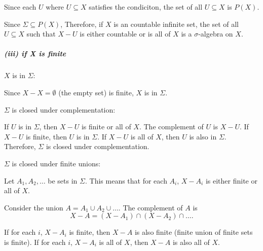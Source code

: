 \documentclass[12pt]{article}
\begin{document}
\par \hspace*{1em}Since each \( U \) where \( U \subseteq X \) satisfies the condiciton, the set of all \( U \subseteq X \) is \( P(X) \). \\
\par \hspace*{1em}Since \( \Sigma \subseteq P(X) \), Therefore, if \( X \) is an countable infinite set, the set of all \( U \subseteq X \) such that \( X - U \) is either countable or is all of \(X\) is a \( \sigma \)-algebra on \( X \).
\subparagraph{(iii) if X is finite}

\par \hspace*{1em}$X$ is in $\Sigma$:

\par \hspace*{1em}Since $X - X = \emptyset$ (the empty set) is finite, $X$ is in $\Sigma$.

\par \hspace*{1em}$\Sigma$ is closed under complementation:

\par \hspace*{1em}If $U$ is in $\Sigma$, then $X - U$ is finite or all of $X$. The complement of $U$ is $X - U$. If $X - U$ is finite, then $U$ is in $\Sigma$. If $X - U$ is all of $X$, then $U$ is also in $\Sigma$. Therefore, $\Sigma$ is closed under complementation.

\par \hspace*{1em}$\Sigma$ is closed under finite unions:

\par \hspace*{1em}Let $A_1, A_2, \ldots$ be sets in $\Sigma$. This means that for each $A_i$, $X - A_i$ is either finite or all of $X$.

\par \hspace*{1em}Consider the union $A = A_1 \cup A_2 \cup \ldots$. The complement of $A$ is
\[
X - A = (X - A_1) \cap (X - A_2) \cap \ldots.
\]

\par \hspace*{1em}If for each $i$, $X - A_i$ is finite, then $X - A$ is also finite (finite union of finite sets is finite). If for each $i$, $X - A_i$ is all of $X$, then $X - A$ is also all of $X$.
\end{document}
